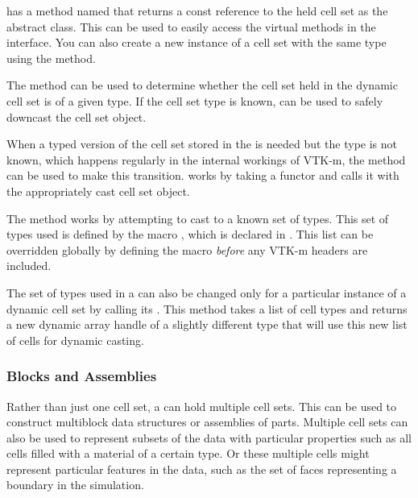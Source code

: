  has a method named  that
returns a const reference to the held cell set as the abstract
 class. This can be used to easily access the
virtual methods in the  interface. You can also
create a new instance of a cell set with the same type using the
 method.

The  method can be used
to determine whether the cell set held in the dynamic cell set is of a
given type. If the cell set type is known,
 can be used to safely
downcast the cell set object.

When a typed version of the cell set stored in the
 is needed but the type is not known, which
happens regularly in the internal workings of VTK-m, the
 method can be used to make this transition.
 works by taking a functor and calls it with the
appropriately cast cell set object.

The  method works by attempting to cast to a known
set of types. This set of types used is defined by the macro
, which is declared in
. This list can be overridden
globally by defining the 
macro \emph{before} any VTK-m headers are included.

The set of types used in a  can also be changed only
for a particular instance of a dynamic cell set by calling its
. This method takes a list of cell types and
returns a new dynamic array handle of a slightly different type that will
use this new list of cells for dynamic casting.


\subsubsection{Blocks and Assemblies}

Rather than just one cell set, a  can hold multiple cell
sets. This can be used to construct multiblock data structures or
assemblies of parts. Multiple cell sets can also be used to represent
subsets of the data with particular properties such as all cells filled
with a material of a certain type. Or these multiple cells might represent
particular features in the data, such as the set of faces representing a
boundary in the simulation.

